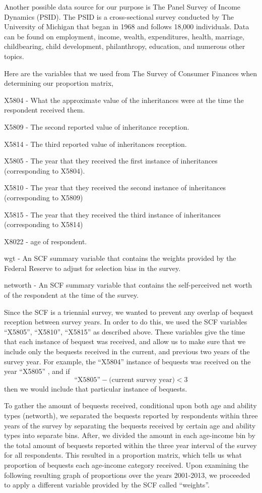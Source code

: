 \documentclass[letterpaper,12pt]{article}
\newcommand{\quotes}[1]{``#1''}
\theoremstyle{definition}
\begin{document}
\begin{spacing}{1.5}
  Another possible data source for our purpose is The Panel Survey of Income Dynamics (PSID). The PSID is a cross-sectional survey conducted by The University of Michigan that began in 1968 and follows 18,000 individuals. Data can be found on employment, income, wealth, expenditures, health, marriage, childbearing, child development, philanthropy, education, and numerous other topics. \citet{UMich}

  Here are the variables that we used from The Survey of Consumer Finances when determining our proportion matrix,

  X5804 - What the approximate value of the inheritances were at the time the respondent received them.

  X5809 - The second reported value of inheritance reception.

  X5814 - The third reported value of inheritances reception.

  X5805 - The year that they received the first instance of inheritances (corresponding to X5804).

  X5810 - The year that they received the second instance of inheritances (corresponding to X5809)

  X5815 - The year that they received the third instance of inheritances (corresponding to X5814)

  X8022 - age of respondent.

  wgt - An SCF summary variable that contains the weights provided by the Federal Reserve to adjust for selection bias in the survey.

  networth - An SCF summary variable that contains the self-perceived net worth of the respondent at the time of the survey.


  Since the SCF is a triennial survey, we wanted to prevent any overlap of bequest reception between survey years. In order to do this, we used the SCF variables \quotes{X5805}, \quotes{X5810}, \quotes{X5815} as described above. These variables give the time that each instance of bequest was received, and allow us to make sure that we include only the bequests received in the current, and previous two years of the survey year. For example, the \quotes{X5804} instance of bequests was received on the year \quotes{X5805} , and if
  \[\text{\quotes{X5805}} - \text{(current~survey~year)} <3\]
  then we would include that particular instance of bequests.

  To gather the amount of bequests received, conditional upon both age and ability types (networth), we separated the bequests reported by respondents within three years of the survey by separating the bequests received by certain age and ability types into separate bins. After, we divided the amount in each age-income bin by the total amount of bequests reported within the three year interval of the survey for all respondents. This resulted in a proportion matrix, which tells us what proportion of bequests each age-income category received. Upon examining the following resulting graph of proportions over the years 2001-2013, we proceeded to apply a different variable provided by the SCF called \quotes{weights}.


\end{spacing}
\end{document}
